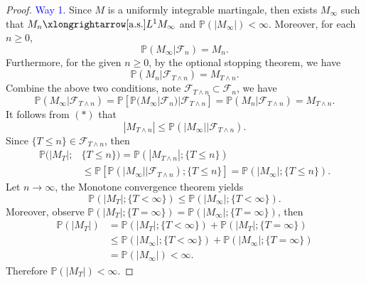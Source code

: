 \documentclass[12pt]{article}
\renewcommand{\(}{\left(}%
\renewcommand{\)}{\right)}%
\renewcommand{\[}{\left[}%
\renewcommand{\]}{\right]}%
\newcommand{\p}{\mathbb{P}}
\newcommand{\f}{\mathscr{F}}
\newtheorem{proof}{Proof.}}
\begin{document}
  \begin{proof}
   \textcolor{blue}{\sffamily Way 1.} Since $M$ is a uniformly integrable martingale, then exists $M_\infty$ such that $M_n\xlongrightarrow[\mathrm{a.s.}]{L^1} M_\infty$ and $\p(|M_\infty|)<\infty$. Moreover, for each $n\geq 0$,
   \begin{equation*}
    \p(M_\infty|\f_n )=M_n.
   \end{equation*}
   Furthermore, for the given $n\geq 0$, by the {\sffamily optional stopping theorem}, we have
   \begin{equation*}
    \p(M_n|\f_{T\wedge n})=M_{T\wedge n}.
   \end{equation*}
   Combine the above two conditions, note $\f_{T\wedge n}\subset\f_n$, we have
   \begin{equation*}
    \p(M_\infty|\f_{T\wedge n} )=\p[\p(M_\infty|\f_n )|\f_{T\wedge n } ]=\p(M_n|\f_{T\wedge n})=M_{T\wedge n}.\tag{$*$}
   \end{equation*}
   It follows from $(*)$ that
   \begin{equation*}
    |M_{T\wedge n}|\leq \p(|M_\infty ||\f_{T\wedge n}).
   \end{equation*}
   Since $\{T\leq n\}\in\f_{T\wedge n}$, then
   \begin{equation*}
    \begin{split}
     \p(|M_{T}|;&\{T\leq n\})=\p(|M_{T\wedge n}|;\{T\leq n\})\\
     &\leq \p[\p(|M_\infty ||\f_{T\wedge n});\{T\leq n\}]=\p(|M_\infty|;\{T\leq n\}).
    \end{split}
   \end{equation*}
   Let $n\to\infty$, the {\sffamily Monotone convergence theorem} yields
   \begin{equation*}
    \p(|M_{T}|;\{T<\infty \})\leq \p(|M_\infty|;\{T<\infty\}).
   \end{equation*}
   Moreover, observe $\p(|M_{T}|;\{T=\infty \})=\p(|M_{\infty}|;\{T=\infty \})$, then
   \begin{equation*}
    \begin{split}
     \p(|M_T|)&=\p(|M_{T}|;\{T<\infty \})+\p(|M_{T}|;\{T=\infty \})\\
     &\leq \p(|M_\infty|;\{T<\infty\})+\p(|M_{\infty}|;\{T=\infty \})\\
     &=\p(|M_\infty|)<\infty.
    \end{split}
   \end{equation*}
   Therefore $\p(|M_T|)<\infty$.


\end{proof}
\end{document}
